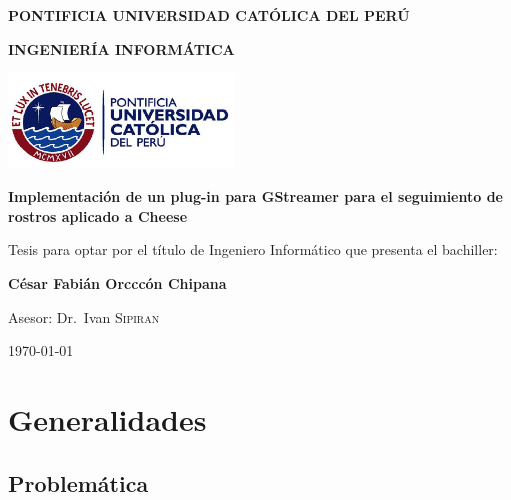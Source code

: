 \documentclass[a4paper,openright,12pt]{report}
\begin{document}
\begin{titlepage}
	\centering

	{\sffamily\large\bfseries PONTIFICIA UNIVERSIDAD CATÓLICA DEL PERÚ \par}
	\vspace{0.2cm}
	{\sffamily\large\bfseries INGENIERÍA INFORMÁTICA\par}
	\vfill

	\includegraphics[width=6cm]{../images/logo-pucp.png}\par\vspace{1cm}
	\vspace{1.5cm}

	{\sffamily\large\bfseries Implementación de un plug-in para GStreamer para
	el seguimiento de rostros aplicado a Cheese\par}
	\vspace{2cm}

	{\sffamily\small Tesis para optar por el título de Ingeniero Informático que
		presenta el bachiller: }

	{\sffamily\Large\bf	César Fabián Orcccón Chipana \par}
	{ \par}
	\vfill
	{\sffamily Asesor: Dr.~Ivan \textsc{Sipiran} \par}

	\vfill

	{\sffamily\large \today\par}
\end{titlepage}

\doclicenseThis

 
\listoffigures
\tableofcontents
\chapter{Generalidades}
\section{Problemática}
\end{document}
